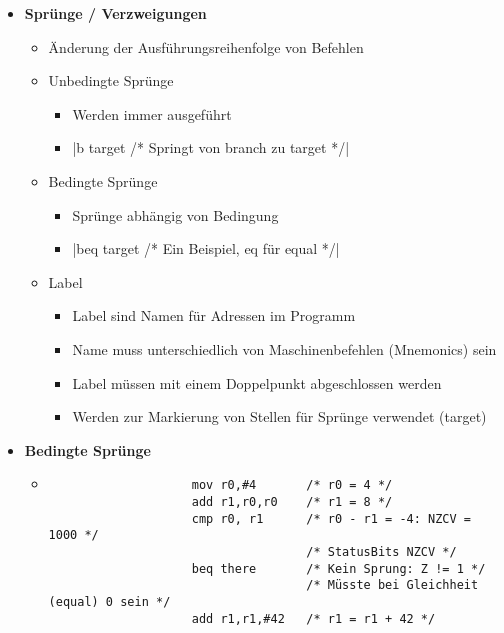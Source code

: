 \begin{itemize}
        \item \textbf{Sprünge / Verzweigungen}
            \begin{itemize}
                \item Änderung der Ausführungsreihenfolge von Befehlen 
                \item Unbedingte Sprünge
                    \begin{itemize}
                        \item Werden immer ausgeführt
                        \item {}|b target /* Springt von branch zu target */| 
                    \end{itemize}
                \item Bedingte Sprünge
                    \begin{itemize}
                        \item Sprünge abhängig von Bedingung 
                        \item {}|beq target /* Ein Beispiel, eq für equal */| 
                    \end{itemize}
                \item Label 
                    \begin{itemize}
                        \item Label sind Namen für Adressen im Programm 
                        \item Name muss unterschiedlich von Maschinenbefehlen (Mnemonics) sein 
                        \item Label müssen mit einem Doppelpunkt abgeschlossen werden
                        \item Werden zur Markierung von Stellen für Sprünge verwendet (target)
                    \end{itemize}
            \end{itemize}
        
        \item \textbf{Bedingte Sprünge}
            \begin{itemize}
                \item[]
                    \begin{verbatim}
                    mov r0,#4       /* r0 = 4 */
                    add r1,r0,r0    /* r1 = 8 */ 
                    cmp r0, r1      /* r0 - r1 = -4: NZCV = 1000 */
                                    /* StatusBits NZCV */
                    beq there       /* Kein Sprung: Z != 1 */
                                    /* Müsste bei Gleichheit (equal) 0 sein */
                    add r1,r1,#42   /* r1 = r1 + 42 */


\end{verbatim}
\end{itemize}
\end{itemize}
